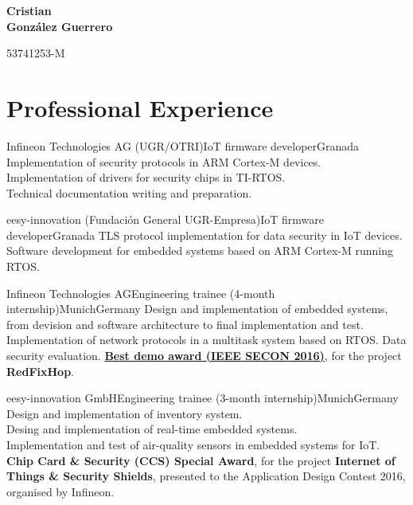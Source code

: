 \documentclass[11pt,a4paper,sans,spanish]{moderncv}
\begin{document}
\begin{minipage}[c]{\textwidth-100pt-0.5em}
    \begin{flushright}
        \textbf{\Huge{Cristian\\\vspace{4pt}González Guerrero}}

        \vspace{4pt}
        \small{53741253-M}
    \end{flushright}
\end{minipage}
\vspace{-5em}

\makecvtitle

\section{Professional Experience}

{Infineon Technologies AG (UGR/OTRI)}{IoT firmware developer}{Granada}{}
{Implementation of security protocols in ARM Cortex-M devices.\\
Implementation of drivers for security chips in TI-RTOS.\\
Technical documentation writing and preparation.
}

{eesy-innovation (Fundación General UGR-Empresa)}{IoT firmware developer}{Granada}{}
{TLS protocol implementation for data security in IoT devices.\\
Software development for embedded systems based on ARM Cortex-M running RTOS.\\
}

{Infineon Technologies AG}{Engineering trainee (4-month internship)}{Munich}{Germany}
{Design and implementation of embedded systems, from devision and software architecture to final implementation and test.\\
Implementation of network protocols in a multitask system based on RTOS.
Data security evaluation.
\href{http://secon2016.ieee-secon.org/content/demos-session}{\textbf{Best demo award (IEEE SECON 2016)}}, for the project \textbf{RedFixHop}.
}

{eesy-innovation GmbH}{Engineering trainee (3-month internship)}{Munich}{Germany}
{Design and implementation of inventory system.\\
Desing and implementation of real-time embedded systems.\\
Implementation and test of air-quality sensors in embedded systems for IoT.\\
\textbf{Chip Card \& Security (CCS) Special Award}, for the project \textbf{Internet of Things \& Security Shields}, presented to the Application Design Contest 2016, organised by Infineon.}
\end{document}
